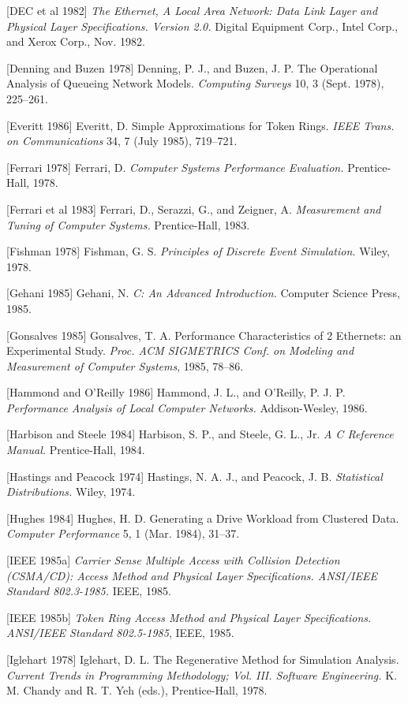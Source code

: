 [DEC et al 1982] \textit{The Ethernet, A Local Area Network: Data Link Layer and Physical Layer Specifications. Version 2.0.} Digital Equipment Corp., Intel Corp., and Xerox Corp., Nov. 1982.

[Denning and Buzen 1978] Denning, P. J., and Buzen, J. P. The Operational Analysis of Queueing Network Models. \textit{Computing Surveys} 10, 3 (Sept. 1978), 225--261.

[Everitt 1986] Everitt, D. Simple Approximations for Token Rings. \textit{IEEE Trans. on Communications} 34, 7 (July 1985), 719--721.

[Ferrari 1978] Ferrari, D. \textit{Computer Systems Performance Evaluation.} Prentice-Hall, 1978.

[Ferrari et al 1983] Ferrari, D., Serazzi, G., and Zeigner, A. \textit{Measurement and Tuning of Computer Systems.} Prentice-Hall, 1983.

[Fishman 1978] Fishman, G. S. \textit{Principles of Discrete Event Simulation.} Wiley, 1978.

[Gehani 1985] Gehani, N. \textit{C: An Advanced Introduction.} Computer Science Press, 1985.

[Gonsalves 1985] Gonsalves, T. A. Performance Characteristics of 2 Ethernets: an Experimental Study. \textit{Proc. ACM SIGMETRICS Conf. on Modeling and Measurement of Computer Systems}, 1985, 78--86.

[Hammond and O'Reilly 1986] Hammond, J. L., and O'Reilly, P. J. P. \textit{Performance Analysis of Local Computer Networks.} Addison-Wesley, 1986.

[Harbison and Steele 1984] Harbison, S. P., and Steele, G. L., Jr. \textit{A C Reference Manual.} Prentice-Hall, 1984.

[Hastings and Peacock 1974] Hastings, N. A. J., and Peacock, J. B. \textit{Statistical Distributions.} Wiley, 1974.

[Hughes 1984] Hughes, H. D. Generating a Drive Workload from Clustered Data. \textit{Computer Performance} 5, 1 (Mar. 1984), 31--37.

[IEEE 1985a] \textit{Carrier Sense Multiple Access with Collision Detection (CSMA/CD): Access Method and Physical Layer Specifications. ANSI/IEEE Standard 802.3-1985.} IEEE, 1985.

[IEEE 1985b] \textit{Token Ring Access Method and Physical Layer Specifications. ANSI/IEEE Standard 802.5-1985}, IEEE, 1985.

[Iglehart 1978] Iglehart, D. L. The Regenerative Method for Simulation Analysis. \textit{Current Trends in Programming Methodology; Vol. III. Software Engineering.} K. M. Chandy and R. T. Yeh (eds.), Prentice-Hall, 1978.

